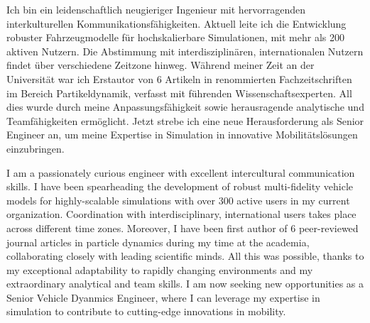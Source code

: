 \documentclass{classic}
\begin{document}
{\rlap{\color{templateColor4}\rule[0mm]{\textwidth}{\ulinewidth}}}
\setlength{\columnsep}{2.5em}
\setlength{\columnseprule}{\ulinewidth}
\begin{paracol}{2}
    {

        Ich bin ein leidenschaftlich neugieriger Ingenieur mit hervorragenden
        interkulturellen Kommunikationsf{\"a}higkeiten. Aktuell leite ich die
        Entwicklung robuster Fahrzeugmodelle für hochskalierbare Simulationen,
        mit mehr als 200 aktiven Nutzern. Die Abstimmung mit
        interdisziplin{\"a}ren, internationalen Nutzern findet {\"u}ber
        verschiedene Zeitzone hinweg. Während meiner Zeit an der Universität
        war ich Erstautor von 6 Artikeln in renommierten Fachzeitschriften im
        Bereich Partikeldynamik, verfasst mit führenden Wissenschaftsexperten.
        All dies wurde durch meine Anpassungsfähigkeit sowie herausragende
        analytische und Teamfähigkeiten ermöglicht. Jetzt strebe ich eine neue
        Herausforderung als Senior Engineer an, um meine Expertise in
        Simulation in innovative Mobilit{\"a}tsl{\"o}sungen einzubringen.\\

    } 
    { 


        I am a passionately curious engineer with excellent intercultural
        communication skills. I have been spearheading the development of
        robust multi-fidelity vehicle models for highly-scalable simulations
        with over 300 active users in my current organization. Coordination
        with interdisciplinary, international users takes place across
        different time zones. Moreover, I have been first author of 6
        peer-reviewed journal articles in particle dynamics during my time at
        the academia, collaborating closely with leading scientific minds. All
        this was possible, thanks to my exceptional adaptability to rapidly
        changing environments and my extraordinary analytical and team skills.
        I am now seeking new opportunities as a Senior Vehicle Dyanmics
        Engineer, where I can leverage my expertise in simulation to contribute
        to cutting-edge innovations in mobility.\\

    }


\end{paracol}
\end{document}
